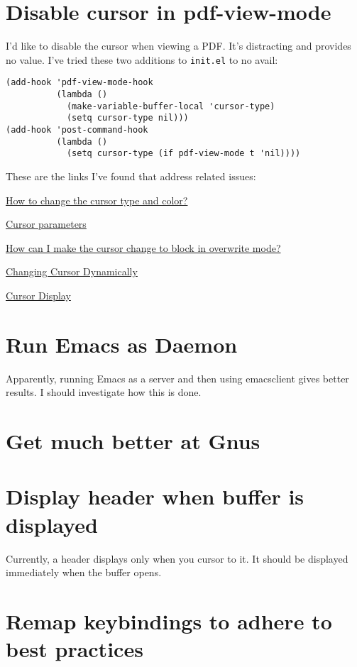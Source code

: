 \documentclass{default}
\begin{document}
\section{Disable cursor in pdf-view-mode}

I'd like to disable the cursor when viewing a PDF. It's distracting and provides no value. I've
tried these two additions to \texttt{init.el} to no avail:

\begin{verbatim}
(add-hook 'pdf-view-mode-hook
          (lambda ()
            (make-variable-buffer-local 'cursor-type)
            (setq cursor-type nil)))
(add-hook 'post-command-hook
          (lambda ()
            (setq cursor-type (if pdf-view-mode t 'nil))))
\end{verbatim}

These are the links I've found that address related issues:

\href{https://emacs.stackexchange.com/questions/392/how-to-change-the-cursor-type-and-color}{How to
  change the cursor type and color?}

\href{https://www.gnu.org/software/emacs/manual/html_node/elisp/Cursor-Parameters.html}{Cursor
  parameters}

\href{https://emacs.stackexchange.com/questions/44650/how-can-i-make-the-cursor-change-to-block-in-overwrite-mode?rq=1}{How
  can I make the cursor change to block in overwrite mode?}

\href{https://www.emacswiki.org/emacs/ChangingCursorDynamically}{Changing Cursor Dynamically}

\href{https://www.gnu.org/software/emacs/manual/html_node/emacs/Cursor-Display.html}{Cursor Display}


\section{Run Emacs as Daemon}

Apparently, running Emacs as a server and then using emacsclient gives better results. I should
investigate how this is done.


\section{Get much better at Gnus}



\section{Display header when buffer is displayed}

Currently, a header displays only when you cursor to it. It should be displayed immediately when the
buffer opens.


\section{Remap keybindings to adhere to best practices}
\end{document}
